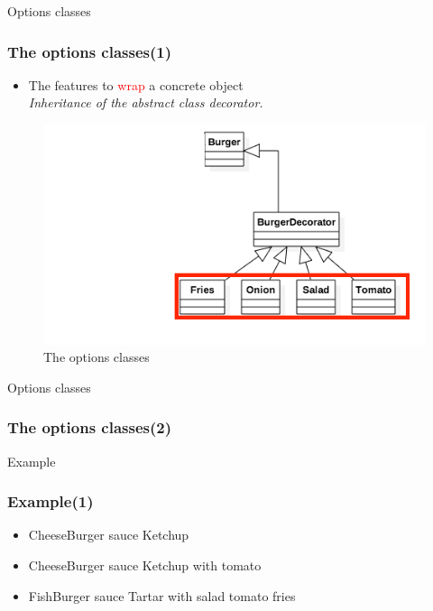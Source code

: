 \documentclass{beamer}
\begin{document}
  \begin{frame}{Options classes}
    \frametitle{The options classes(1)}
    \begin{itemize}
      \item The features to \textcolor{red}{wrap} a concrete object\\
      \textit{Inheritance of the abstract class decorator.}
    \end{itemize}
    \begin{figure}[!b]
      \centering
      \includegraphics[scale=0.4]{options}
      \caption{The options classes}
    \end{figure}
  \end{frame}

  \begin{frame}{Options classes}
    \frametitle{The options classes(2)}
    
  \end{frame}

  \begin{frame}{Example}
    \frametitle{Example(1)}
    
    \begin{itemize}
      \item CheeseBurger sauce Ketchup
      \item CheeseBurger sauce Ketchup with tomato
      \item FishBurger sauce Tartar with salad tomato fries
    \end{itemize}
  \end{frame}
\end{document}
